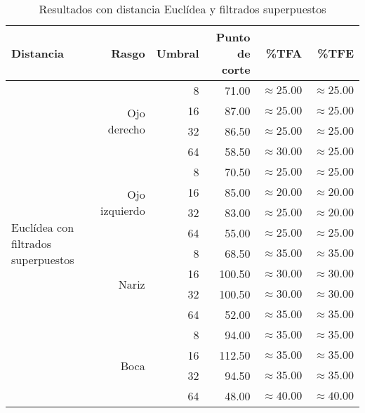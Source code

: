 \begin{table}
\begin{tabular}{|l|r|r|r|r|r|}
 \hline
  Distancia & Rasgo & Umbral & Punto de corte & \%TFA  & \%TFE \\
  \hline \hline
  \multirow{16}{*}{Euclídea con filtrados superpuestos}
& \multirow{4}{*}{Ojo derecho} & 8  & 71.00 & $\approx 25.00$ & $\approx 25.00$ \\
& & 16 & 87.00 & $\approx 25.00$ & $\approx 25.00$ \\
& & 32 & 86.50 & $\approx 25.00$ & $\approx 25.00$ \\
& & 64 & 58.50 & $\approx 30.00$ & $\approx 25.00$ \\ \cline{2-6}

& \multirow{4}{*}{Ojo izquierdo} & 8  & 70.50 & $\approx 25.00$ & $\approx 25.00$ \\
& & 16 & 85.00 & $\approx 20.00$ & $\approx 20.00$ \\
& & 32 & 83.00 & $\approx 25.00$ & $\approx 20.00$ \\
& & 64 & 55.00 & $\approx 25.00$ & $\approx 25.00$ \\ \cline{2-6}

& \multirow{4}{*}{Nariz} & 8  & 68.50 & $\approx 35.00$ & $\approx 35.00$ \\
& & 16 & 100.50 & $\approx 30.00$ & $\approx 30.00$ \\
& & 32 & 100.50 & $\approx 30.00$ & $\approx 30.00$ \\
& & 64 & 52.00 & $\approx 35.00$ & $\approx 35.00$ \\ \cline{2-6}

& \multirow{4}{*}{Boca} & 8  & 94.00 & $\approx 35.00$ & $\approx 35.00$ \\
& & 16 & 112.50 & $\approx 35.00$ & $\approx 35.00$ \\
& & 32 & 94.50 & $\approx 35.00$ & $\approx 35.00$ \\
& & 64 & 48.00 & $\approx 40.00$ & $\approx 40.00$ \\ \hline

 \end{tabular}
 \caption{Resultados con distancia Euclídea y filtrados superpuestos}
 \label{tab:euc_super}
\end{table}
